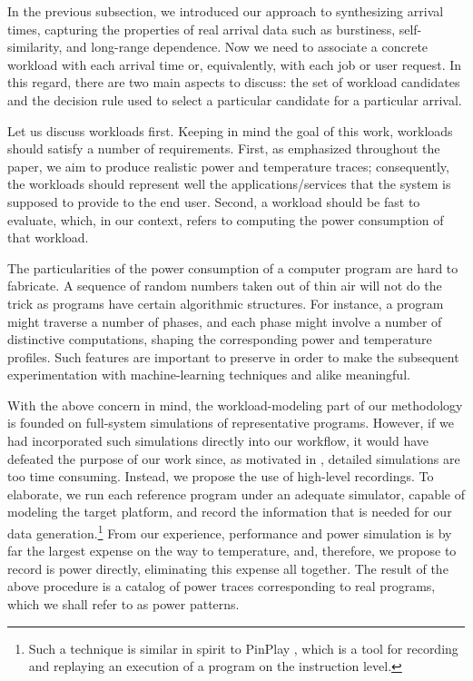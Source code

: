 In the previous subsection, we introduced our approach to synthesizing arrival
times, capturing the properties of real arrival data such as burstiness,
self-similarity, and long-range dependence. Now we need to associate a concrete
workload with each arrival time or, equivalently, with each job or user request.
In this regard, there are two main aspects to discuss: the set of workload
candidates and the decision rule used to select a particular candidate for a
particular arrival.

Let us discuss workloads first. Keeping in mind the goal of this work, workloads
should satisfy a number of requirements. First, as emphasized throughout the
paper, we aim to produce realistic power and temperature traces; consequently,
the workloads should represent well the applications/services that the system is
supposed to provide to the end user. Second, a workload should be fast to
evaluate, which, in our context, refers to computing the power consumption of
that workload.

The particularities of the power consumption of a computer program are hard to
fabricate. A sequence of random numbers taken out of thin air will not do the
trick as programs have certain algorithmic structures. For instance, a program
might traverse a number of phases, and each phase might involve a number of
distinctive computations, shaping the corresponding power and temperature
profiles. Such features are important to preserve in order to make the
subsequent experimentation with machine-learning techniques and alike
meaningful.

With the above concern in mind, the workload-modeling part of our methodology is
founded on full-system simulations of representative programs. However, if we
had incorporated such simulations directly into our workflow, it would have
defeated the purpose of our work since, as motivated in ,
detailed simulations are too time consuming. Instead, we propose the use of
high-level recordings. To elaborate, we run each reference program under an
adequate simulator, capable of modeling the target platform, and record the
information that is needed for our data generation.\footnote{Such a technique is
similar in spirit to PinPlay \cite{patil2010}, which is a tool for recording and
replaying an execution of a program on the instruction level.} From our
experience, performance and power simulation is by far the largest expense on
the way to temperature, and, therefore, we propose to record is power directly,
eliminating this expense all together. The result of the above procedure is a
catalog of power traces corresponding to real programs, which we shall refer to
as power patterns.

